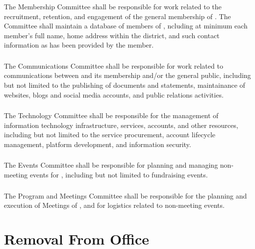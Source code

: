 \subsubsection{} \label{membership-committee}
The Membership Committee shall be responsible for work related to the recruitment, retention, and engagement of the general membership of \thedistrict{}. The Committee shall maintain a database of members of \thedistrict{}, ncluding at minimum each member's full name, home address within the district, and such contact information as has been provided by the member.

\subsubsection{} \label{comms-tech-committee}
The Communications Committee shall be responsible for work related to communications between \thedistrict{} and its membership and/or the general public, including but not limited to the publishing of documents and statements, maintainance of websites, blogs and social media accounts, and public relations activities.

\subsubsection{}
The Technology Committee shall be responsible for the management of information technology infrastructure, services, accounts, and other resources, including but not limited to the service procurement, account lifecycle management, platform development, and information security.

\subsubsection{} \label{events-committee}
The Events Committee shall be responsible for planning and managing non-meeting events for \thedistrict{}, including but not limited to fundraising events.

\subsubsection{} \label{meetings-committee}
The Program and Meetings Committee shall be responsible for the planning and execution of Meetings of \thedistrict{}, and for logistics related to non-meeting events.

\section{Removal From Office}
